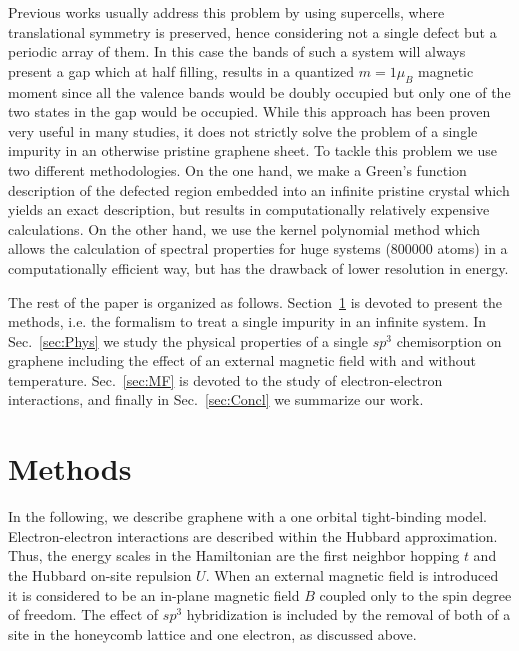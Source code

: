 Previous works usually address this problem by using supercells, where translational symmetry is preserved, hence considering not a single defect but a periodic array of them.\cite{Duplock2004,Boukhvalov2008,Yazyev2010,Sofo2012,gonzalez2016atomic}
In this case the bands of such a system will always present a gap which at half filling, results in a quantized $m=1\mu_B$ magnetic moment since all the valence bands would be doubly occupied but only one of the two states in the gap would be occupied.
While this approach has been proven very useful in many studies, it does not strictly solve the problem of a single impurity in an otherwise pristine graphene sheet.
To tackle this problem we use two different methodologies. On the one hand, we
make a Green's function description of the defected region embedded into an
infinite pristine crystal which yields an exact description, but results in
computationally relatively expensive calculations. On the other hand, we use
the kernel polynomial method which allows the calculation of spectral
properties for huge systems (800000 atoms) in a computationally efficient way,
but has the drawback of lower resolution in energy.

The rest of the paper is organized as follows. Section~\ref{sec:GF} is devoted
to present the methods, i.e. the formalism to treat a single impurity in an
infinite system. In Sec.~\ref{sec:Phys} we study the physical properties of a
single $sp^3$ chemisorption on graphene including the effect of an external
magnetic field with and without temperature. Sec.~\ref{sec:MF} is devoted to
the study of electron-electron interactions, and finally in
Sec.~\ref{sec:Concl} we summarize our work.


\section{Methods}
\label{sec:GF}
In the following, we describe graphene with a one orbital tight-binding model.  Electron-electron interactions are described within the Hubbard approximation.  Thus, the energy scales in the Hamiltonian are the first neighbor hopping $t$ and the Hubbard on-site repulsion $U$. When an external magnetic field is introduced it is considered to be an in-plane magnetic field $B$ coupled only to the spin degree of freedom.
The effect of $sp^3$ hybridization is included by the removal of both of a site in the honeycomb lattice and one electron, as discussed above.

